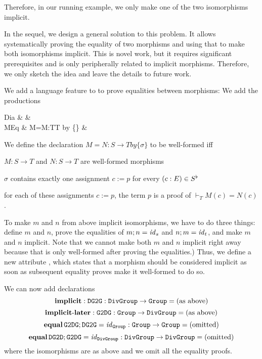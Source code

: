 Therefore, in our running example, we only make one of the two isomorphisms implicit.

In the sequel, we design a general solution to this problem.
It allows systematically proving the equality of two morphisms and using that to make both isomorphisms implicit.
This is novel work, but it requires significant prerequisites and is only peripherally related to implicit morphisms.
Therefore, we only sketch the idea and leave the details to future work.

We add a language feature to \mmt to prove equalities between morphisms:
We add the productions
\begin{grammar}
Dia   &   &\\
MEq   &  M=M:T\to T by \{\} &\\
\end{grammar}


We define the declaration $M=N:S\to T by \{\sigma\}$ to be well-formed iff
\begin{compactitem} 
  \item $M:S\to T$ and $N:S\to T$ are well-formed morphisms
  \item $\sigma$ contains exactly one assignment $c:=p$ for every $(c:E)\in S^\flat$
  \item for each of these assignments $c:=p$, the term $p$ is a proof of $\vdash_T M(c)=N(c)$.
\end{compactitem}

To make $m$ and $n$ from above implicit isomorphisms, we have to do three things: define $m$ and $n$, prove the equalities of $m;n=\mathit{id}_{s}$ and $n;m=\mathit{id}_{t}$, and make $m$ and $n$ implicit.
Note that we cannot make both $m$ and $n$ implicit right away because that is only well-formed after proving the equalities.)
Thus, we define a new attribute , which states that a morphism should be considered implicit as soon as subsequent equality proves make it well-formed to do so.

\begin{example}[Isomorphisms]
We can now add declarations
 \[\operatorname{\mathbf{implicit}}:\operatorname{\mathtt{DG2G}}:\operatorname{\mathtt{DivGroup}}\to\operatorname{\mathtt{Group}}=\text{(as above)}\]
 \[\operatorname{\mathbf{implicit-later}}:\operatorname{\mathtt{G2DG}}:\operatorname{\mathtt{Group}}\to\operatorname{\mathtt{DivGroup}}=\text{(as above)}\]
 \[\operatorname{\mathbf{equal}}\operatorname{\mathtt{G2DG}};\operatorname{\mathtt{DG2G}}=\mathit{id}_{\operatorname{\mathtt{Group}}}:\operatorname{\mathtt{Group}}\to\operatorname{\mathtt{Group}}=\text{(omitted)}\]
 \[\operatorname{\mathbf{equal}}\operatorname{\mathtt{DG2D}};\operatorname{\mathtt{G2DG}}=\mathit{id}_{\operatorname{\mathtt{DivGroup}}}:\operatorname{\mathtt{DivGroup}}\to\operatorname{\mathtt{DivGroup}}=\text{(omitted)}\]
where the isomorphisms are as above and we omit all the equality proofs.
\end{example}

